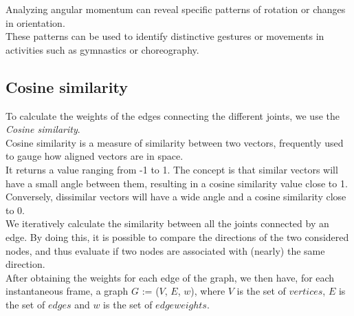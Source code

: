 Analyzing angular momentum can reveal specific patterns of rotation or changes in orientation. \\
These patterns can be used to identify distinctive gestures or movements in activities such as gymnastics or choreography.

\subsection{Cosine similarity}
To calculate the weights of the edges connecting the different joints, we use the \textit{Cosine similarity}. \\
Cosine similarity is a measure of similarity between two vectors, frequently used to gauge how aligned vectors are in space. \\
It returns a value ranging from -1 to 1.
The concept is that similar vectors will have a small angle between them, resulting in a cosine similarity value close to 1. \\
Conversely, dissimilar vectors will have a wide angle and a cosine similarity close to 0.\\
We iteratively calculate the similarity between all the joints connected by an edge.
By doing this, it is possible to compare the directions of the two considered nodes, and thus evaluate if two nodes are associated with
(nearly) the same direction.
\\

After obtaining the weights for each edge of the graph, we then have, for each instantaneous frame, a graph $G$ := ($V$, $E$, $w$), where 
$V$ is the set of $vertices$, $E$ is the set of $edges$ and $w$ is the set of $edge weights$.
